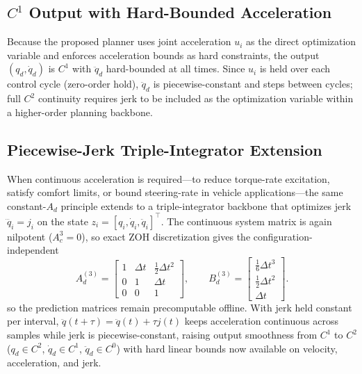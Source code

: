\subsection{\texorpdfstring{\(C^1\) Output with Hard-Bounded
Acceleration}{C. C\^{}1 Output with Hard-Bounded Acceleration}}\label{c.-c1-output-with-hard-bounded-acceleration}
Because the proposed planner uses joint acceleration \(u_i\) as the
direct optimization variable and enforces acceleration bounds as hard
constraints, the output \((q_d, \dot{q}_d)\) is \(C^1\) with
\(\ddot{q}_d\) hard-bounded at all times. Since \(u_i\) is held over
each control cycle (zero-order hold), \(\ddot{q}_d\) is
piecewise-constant and steps between cycles; full \(C^2\) continuity
requires jerk to be included as the optimization variable within a
higher-order planning backbone.

\subsection{Piecewise-Jerk Triple-Integrator Extension}\label{d.-piecewise-jerk-triple-integrator-extension-for-continuous-acceleration}

When continuous acceleration is required---to reduce torque-rate
excitation, satisfy comfort limits, or bound steering-rate in vehicle
applications---the same constant-\(A_d\) principle extends to a
triple-integrator backbone that optimizes jerk \(\dddot q_i = j_i\) on the
state \(z_i=[q_i,\dot q_i,\ddot q_i]^\top\). The continuous system matrix
is again nilpotent (\(A_c^3=0\)), so exact ZOH discretization gives the
configuration-independent
\begin{equation}
\label{eq:triple-zoh}
A_d^{(3)} =
\begin{bmatrix}
1&\Delta t&\tfrac{1}{2}\Delta t^2\\
0&1&\Delta t\\
0&0&1
\end{bmatrix},
\qquad
B_d^{(3)} =
\begin{bmatrix}
\tfrac{1}{6}\Delta t^3\\
\tfrac{1}{2}\Delta t^2\\
\Delta t
\end{bmatrix}.
\end{equation}
so the prediction matrices remain precomputable offline. With jerk held
constant per interval, \(\ddot q(t+\tau)=\ddot q(t)+\tau j(t)\) keeps
acceleration continuous across samples while jerk is piecewise-constant,
raising output smoothness from \(C^1\) to \(C^2\) (\(q_d\in C^2\),
\(\dot q_d\in C^1\), \(\ddot q_d\in C^0\)) with hard linear bounds now
available on velocity, acceleration, and jerk.

